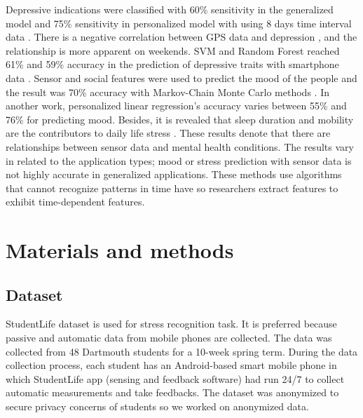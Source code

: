\documentclass[3p,times,procedia]{elsarticle}
\begin{document}
Depressive indications were classified with 60\% sensitivity in the generalized model and 75\% sensitivity in personalized model with using 8 days time interval data \cite{Canzian2015}. There is a negative correlation between GPS data and depression \cite{Saeb2016}, and the relationship is more apparent on weekends. SVM and Random Forest reached 61\% and 59\% accuracy in the prediction of depressive traits with smartphone data \cite{Wahle2016}. Sensor and social features were used to predict the mood of the people and the result was 70\% accuracy with Markov-Chain Monte Carlo methods \cite{Ma2014}. In another work, personalized linear regression's accuracy varies between 55\% and 76\% for predicting mood. Besides, it is revealed that sleep duration and mobility are the contributors to daily life stress \cite{Ben-Zeev2015}. These results denote that there are relationships between sensor data and mental health conditions. The results vary in related to the application types; mood or stress prediction with sensor data is not highly accurate in generalized applications. These methods use algorithms that cannot recognize patterns in time have so researchers extract features to exhibit time-dependent features.


\section{Materials and methods}
\label{materials-methods}

\subsection{Dataset}
StudentLife dataset \cite{Wang2014} is used for stress recognition task. It is preferred because passive and automatic data from mobile phones are collected. The data was collected from 48 Dartmouth students for a 10-week spring term. During the data collection process, each student has an Android-based smart mobile phone in which StudentLife app (sensing and feedback software) had run 24/7 to collect automatic measurements and take feedbacks. The dataset was anonymized to secure privacy concerns of students so we worked on anonymized data.
\end{document}
